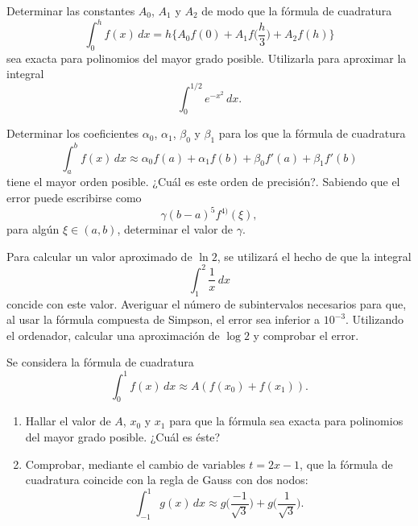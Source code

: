 \documentclass[11pt]{article}
\begin{document}
\begin{problemas}
  \begin{problema}
  Determinar las constantes $A_0$, $A_1$ y $A_2$ de modo que la
  fórmula de cuadratura
  \begin{equation*}
    \int_0^h f(x)\,dx = h \bigg\{
    A_0f(0) + A_1f\bigg(\frac{h}{3}\bigg) + A_2 f(h) \bigg\}
  \end{equation*}
  sea exacta para polinomios del mayor grado posible. Utilizarla para
  aproximar la integral
  \begin{equation*}
    \int_0^{1/2} e^{-x^2}\, dx.
  \end{equation*}
  \end{problema}
 
  \begin{problema}
    Determinar los coeficientes $\alpha_0$, $\alpha_1$,  $\beta_0$ y
    $\beta_1$ para los que la fórmula de cuadratura
    \begin{equation*}
      \int_a^b f(x)\, dx \approx \alpha_0 f(a) + \alpha_1 f(b)
      + \beta_0 f'(a) + \beta_1 f'(b)
    \end{equation*}
    tiene el mayor orden posible. ¿Cuál es este orden de precisión?.
    Sabiendo que el error puede escribirse como
    \begin{equation*}
      \gamma (b-a)^5 f^{4)}(\xi),
    \end{equation*}
    para algún $\xi\in(a,b)$, determinar el valor de $\gamma$.
  \end{problema}

  \begin{problema}
    Para calcular un valor aproximado de $\ln 2$, se utilizará el
    hecho de que la integral
    \begin{equation*}
      \int_1^2 \frac{1}{x}\, dx
    \end{equation*}
    concide con este valor. Averiguar el número de subintervalos
    necesarios para que, al usar la fórmula compuesta de Simpson, el
    error sea inferior a $10^{-3}$. Utilizando el ordenador, calcular
    una aproximación de $\log 2$ y comprobar el error.
  \end{problema}

  \begin{problema}
    Se considera la fórmula de cuadratura
    \begin{equation*}
      \int_0^1 f(x)\, dx \approx A (f(x_0) + f(x_1)).
    \end{equation*}
    \begin{enumerate}
    \item Hallar el valor de $A$, $x_0$ y $x_1$ para que la
      fórmula sea exacta para polinomios del mayor grado
      posible. ¿Cuál es éste?
    \item Comprobar, mediante el cambio de variables $t=2x-1$, que
      la fórmula de cuadratura coincide con la regla de Gauss con
      dos nodos:
      \begin{equation*}
        \int_{-1}^1 g(x)\,dx \approx g\bigg(\frac{-1}{\sqrt
          3}\bigg) + g\bigg(\frac{1}{\sqrt 3}\bigg).
      \end{equation*}
    \end{enumerate}
  \end{problema}
  

\end{problemas}
\end{document}
